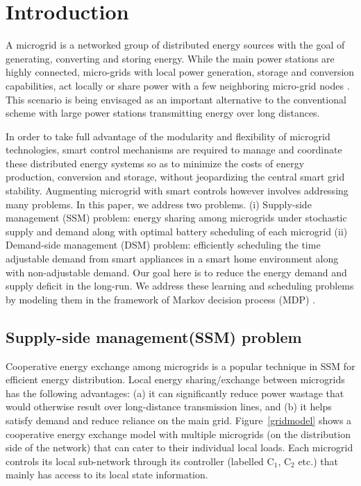 \section{Introduction}

A microgrid is a networked group of distributed energy sources with the goal of
generating, converting and storing energy. 
While the main power stations are highly connected, micro-grids with local power generation, storage
and conversion capabilities, act locally or share power with a few neighboring micro-grid nodes \cite{farhangi2010path}.
This scenario is being envisaged as an important alternative to the conventional scheme with
large power stations transmitting energy over long distances.

In order to take full advantage of the modularity and flexibility of microgrid technologies, smart control mechanisms are required to manage and coordinate these distributed energy systems so as to minimize the costs of energy production, conversion and storage, without jeopardizing the central smart grid stability.
 Augmenting microgrid with smart controls however involves addressing many problems. In this paper, we address two  problems. (i) Supply-side management (SSM) problem: energy sharing among  microgrids under stochastic supply and demand along with  optimal battery scheduling of each microgrid (ii) Demand-side management (DSM) problem: efficiently scheduling the time adjustable demand from smart appliances in a smart home environment along with non-adjustable demand. Our goal here is to reduce the energy demand and supply deficit in the long-run. We address these learning and scheduling problems by modeling them in the framework of Markov decision process (MDP) \cite{puterman2014markov}. 

\subsection{Supply-side management(SSM) problem}
 Cooperative energy exchange among microgrids is a popular technique in SSM for efficient energy distribution.  Local energy sharing/exchange between microgrids has the
following advantages:
(a) it can significantly reduce power wastage that would
otherwise result over long-distance transmission lines, and (b) it
helps satisfy demand and reduce reliance on the main grid. Figure~\ref{gridmodel} shows a cooperative energy exchange model with multiple microgrids
(on the distribution side of the network) that can cater to their individual
local loads. Each microgrid controls its local sub-network through its controller (labelled
$\mbox{C}_1$, $\mbox{C}_2$ etc.) that mainly has access to its local state information.



